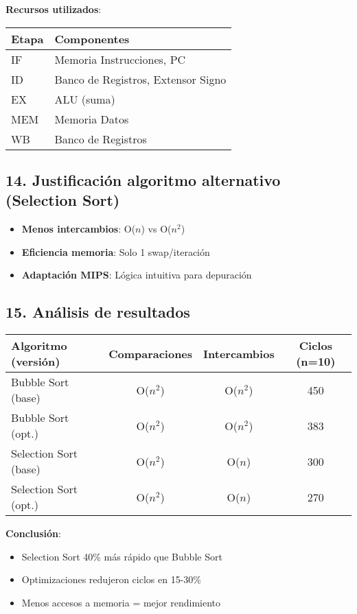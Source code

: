 \documentclass{article}
\begin{document}
\textbf{Recursos utilizados}:
\begin{center}
  \begin{tabular}{l|l}
    \textbf{Etapa} & \textbf{Componentes} \\
    \hline
    IF & Memoria Instrucciones, PC \\
    ID & Banco de Registros, Extensor Signo \\
    EX & ALU (suma) \\
    MEM & Memoria Datos \\
    WB & Banco de Registros \\
  \end{tabular}
\end{center}

\subsection*{14. Justificación algoritmo alternativo (Selection Sort)}
\begin{itemize}
  \item \textbf{Menos intercambios}: O($n$) vs O($n^2$)
  \item \textbf{Eficiencia memoria}: Solo 1 swap/iteración
  \item \textbf{Adaptación MIPS}: Lógica intuitiva para depuración
\end{itemize}

\subsection*{15. Análisis de resultados}
\begin{center}
  \begin{tabular}{l|c|c|c}
    \textbf{Algoritmo (versión)} & \textbf{Comparaciones} & \textbf{Intercambios} & \textbf{Ciclos (n=10)} \\
    \hline
    Bubble Sort (base) & O($n^2$) & O($n^2$) & 450 \\
    Bubble Sort (opt.) & O($n^2$) & O($n^2$) & 383 \\
    Selection Sort (base) & O($n^2$) & O($n$) & 300 \\
    Selection Sort (opt.) & O($n^2$) & O($n$) & 270 \\
  \end{tabular}
\end{center}

\textbf{Conclusión}: 
\begin{itemize}
  \item Selection Sort 40\% más rápido que Bubble Sort
  \item Optimizaciones redujeron ciclos en 15-30\%
  \item Menos accesos a memoria = mejor rendimiento
\end{itemize}
\end{document}
